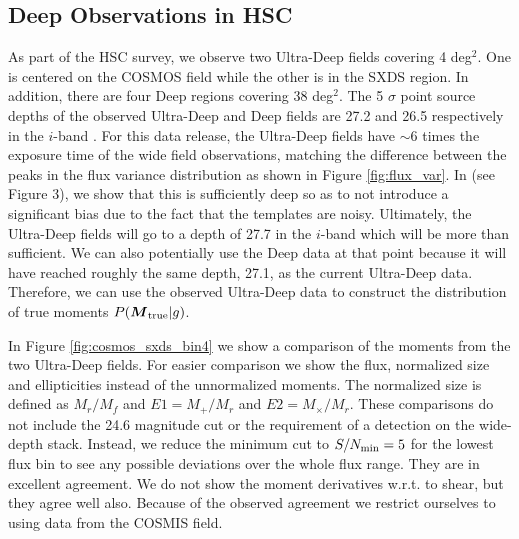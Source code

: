 \documentclass[useAMS,usenatbib]{mnras}
\newcommand{\vecM}{\mbox{\boldmath $M$}}
\begin{document}
\subsection{Deep Observations in HSC}
As part of the HSC survey, we observe two Ultra-Deep fields covering 4 deg$^2$.  One is centered on the COSMOS \citep{2007ApJS..172..196K} field while the other is in the SXDS \citep{SXDS} region.  In addition, there are four Deep regions covering 38 deg$^2$.  The 5 $\sigma$ point source depths of the observed Ultra-Deep and Deep fields are 27.2 and 26.5 respectively in the $i$-band \cite{DataPaper:inprep}.  For this data release, the Ultra-Deep fields have $\sim$6 times the exposure time of the wide field observations, matching the difference between the peaks in the flux variance distribution as shown in  Figure \ref{fig:flux_var}.  In \cite{Bernstein2016} (see Figure 3), we show that this is sufficiently deep so as to not introduce a significant bias due to the fact that the templates are noisy.  Ultimately, the Ultra-Deep fields will go to a depth of 27.7 in the $i$-band which will be more than sufficient.  We can also potentially use the Deep data at that point because it will have reached roughly the same depth, 27.1, as the current Ultra-Deep data.  Therefore, we can use the observed Ultra-Deep data to construct the distribution of true moments $P(\vecM_{\rm true}|g)$. 

In Figure \ref{fig:cosmos_sxds_bin4} we show a comparison of the moments from the two Ultra-Deep fields.  For easier comparison we show the flux, normalized size and ellipticities instead of the unnormalized moments.  The normalized size is defined as $M_r/M_f$ and $E1=M_+/M_r$ and $E2=M_\times/M_r$.  These comparisons do not include the 24.6 magnitude cut or the requirement of a detection on the wide-depth stack.  Instead, we reduce the minimum cut to $S/N_{\rm min}=5$ for the lowest flux bin to see any possible deviations over the whole flux range.  They are in excellent agreement.  We do not show the moment derivatives w.r.t. to shear, but they agree well also. Because of the observed agreement we restrict ourselves to using data from the COSMIS field.
\end{document}

